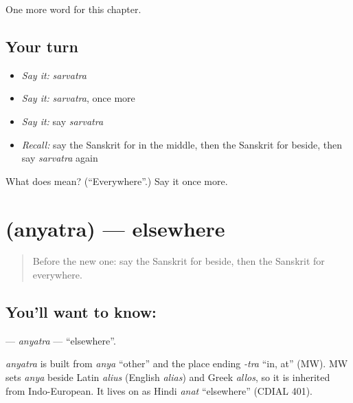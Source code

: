 \begin{grammarlens}[title={What you've built}]
One more word for this chapter.
\end{grammarlens}

\subsection*{Your turn}
\begin{itemize}
\raggedright
  \item \emph{Say it:} \emph{sarvatra}
  \item \emph{Say it:} \emph{sarvatra}, once more
  \item \emph{Say it:} say \emph{sarvatra}
  \item \emph{Recall:} say the Sanskrit for in the middle, then the Sanskrit for beside, then say \emph{sarvatra} again
\end{itemize}

\begin{tcolorbox}[breakable,colback=teal!4,colframe=teal!35!black,title={Before you move on}]
What does  mean? (\textquotedblleft{}Everywhere\textquotedblright{}.) Say it once more.
\end{tcolorbox}
\section[\texorpdfstring{\sk{अन्यत्र} (anyatra)}{अन्यत्र (anyatra)}]{ (anyatra) — elsewhere}

\label{lesson:SA-C95-anyatra}



\begin{quote}
Before the new one: say the Sanskrit for beside, then the Sanskrit for everywhere.
\end{quote}

\subsection*{You'll want to know: }
\textbf{} — \emph{anyatra} — \textquotedblleft{}elsewhere\textquotedblright{}.

\begin{cousinweb}
\emph{anyatra} is built from \emph{anya} \textquotedblleft{}other\textquotedblright{} and the place ending \emph{-tra} \textquotedblleft{}in, at\textquotedblright{} (MW). MW sets \emph{anya} beside Latin \emph{alius} (English \emph{alias}) and Greek \emph{allos}, so it is inherited from Indo-European. It lives on as Hindi \emph{anat} \textquotedblleft{}elsewhere\textquotedblright{} (CDIAL 401).
\end{cousinweb}

